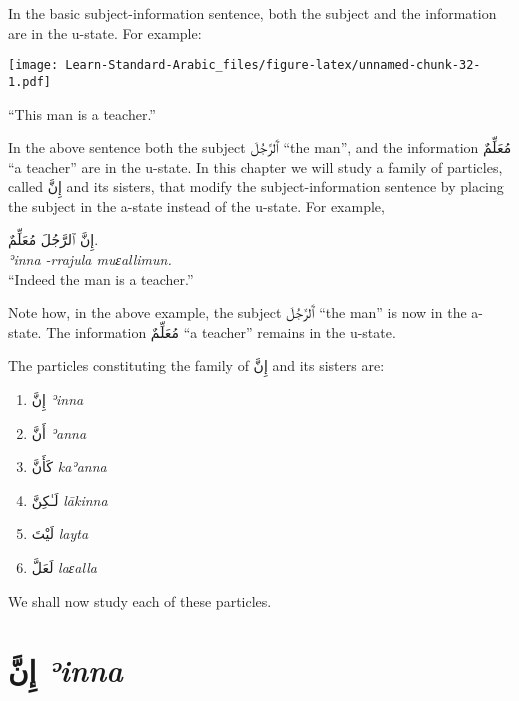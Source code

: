 \documentclass[
  10pt,
]{book}
\providecommand{\tightlist}{%
  \setlength{\itemsep}{0pt}\setlength{\parskip}{0pt}}
\begin{document}
In the basic subject-information sentence, both the subject and the information are in the u-state. For example:

\texttt{[image: Learn-Standard-Arabic\_files/figure-latex/unnamed-chunk-32-1.pdf]}

\enquote{This man is a teacher.}

In the above sentence both the subject \foreignlanguage{arabic}{ٱَلرَّجُلَ} \enquote{the man}, and the information \foreignlanguage{arabic}{مُعَلِّمٌ} \enquote{a teacher} are in the u-state. In this chapter we will study a family of particles, called
\foreignlanguage{arabic}{إِنَّ} and its sisters,
that modify the subject-information sentence by placing the subject in the a-state instead of the u-state. For example,

\foreignlanguage{arabic}{إِنَّ ٱلرَّجُلَ مُعَلِّمٌ.}\\
\emph{ʾinna -rrajula muɛallimun.}\\
\enquote{Indeed the man is a teacher.}

Note how, in the above example, the subject \foreignlanguage{arabic}{ٱَلرَّجُلَ} \enquote{the man} is now in the a-state. The information \foreignlanguage{arabic}{مُعَلِّمٌ} \enquote{a teacher} remains in the u-state.

The particles constituting the family of
\foreignlanguage{arabic}{إِنَّ} and its sisters
are:

\begin{enumerate}
\def\labelenumi{\arabic{enumi}.}
\tightlist
\item
  \foreignlanguage{arabic}{إِنَّ} \emph{ʾinna} \vphantom{\huge J}
\item
  \foreignlanguage{arabic}{أَنَّ} \emph{ʾanna} \vphantom{\huge J}
\item
  \foreignlanguage{arabic}{کَأَنَّ} \emph{kaʾanna} \vphantom{\huge J}
\item
  \foreignlanguage{arabic}{لَـٰکِنَّ} \emph{lākinna} \vphantom{\huge J}
\item
  \foreignlanguage{arabic}{لَيْتَ} \emph{layta} \vphantom{\huge J}
\item
  \foreignlanguage{arabic}{لَعَلَّ} \emph{laɛalla} \vphantom{\huge J}
\end{enumerate}

We shall now study each of these particles.

\section{\texorpdfstring{\foreignlanguage{arabic}{إِنَّ} \emph{ʾinna}}{إِنَّ ʾinna}}\label{ux625ux646-einna}
\end{document}
